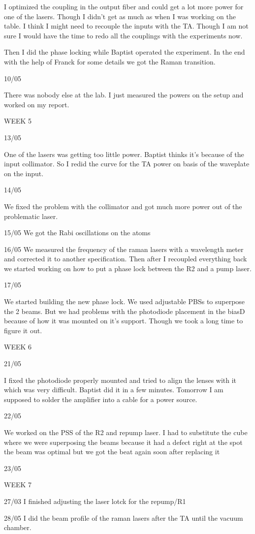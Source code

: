 I optimized the coupling in the output fiber and could get a lot more power for one of the lasers. Though I didn't get as much as when I was working on the table. I think I might need to recouple the inputs with the TA. Though I am not sure I would have the time to redo all the couplings with the experiments now.

Then I did the phase locking while Baptist operated the experiment. In the end with the help of Franck for some details we got the Raman transition.

10/05

There was nobody else at the lab. I just measured the powers on the setup and worked on my report.

WEEK 5

13/05

One of the lasers was getting too little power. Baptist thinks it's because of the input collimator. So I redid the curve for the TA power on basis of the waveplate on the input.

14/05

We fixed the problem with the collimator and got much more power out of the problematic laser.

15/05
We got the Rabi oscillations on the atoms

16/05
We measured the frequency of the raman lasers with a wavelength meter and corrected it to another specification. Then after I recoupled everything back we started working on how to put a phase lock between the R2 and a pump laser.

17/05

We started building the new phase lock. We used adjustable PBSs to superpose the 2 beams. But we had problems with the photodiode placement in the biasD because of how it was mounted on it's support. Though we took a long time to figure it out.

WEEK 6

21/05

I fixed the photodiode properly mounted and tried to align the lenses with it which was very difficult. Baptist did it in a few minutes. Tomorrow I am supposed to solder the amplifier into a cable for a power source.

22/05

We worked on the PSS of the R2 and repump laser. I had to substitute the cube where we were superposing the beams because it had a defect right at the spot the beam was optimal but we got the beat again soon after replacing it

23/05

WEEK 7

27/03
I finished adjusting the laser lotck for the repump/R1

28/05
I did the beam profile of the raman lasers after the TA until the vacuum chamber.
